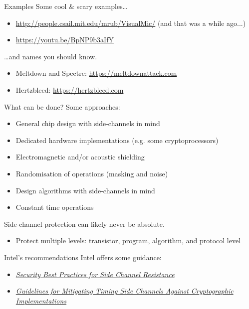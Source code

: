 \begin{frame}{Examples}
  Some cool \& scary examples\dots
  \begin{itemize}[<+(1)->]
    \item {\small\url{http://people.csail.mit.edu/mrub/VisualMic/}} (and that was a while ago...)
    \item {\small\url{https://youtu.be/BpNP9b3aIfY}}
  \end{itemize}

  \vspace*{1em}

  \pause
  \dots{}and names you should know.
  \begin{itemize}[<+(1)->]
    \item Meltdown and Spectre: {\small\url{https://meltdownattack.com}}
    \item Hertzbleed: {\small\url{https://hertzbleed.com}}
  \end{itemize}
\end{frame}

\begin{frame}{What can be done?}
  Some approaches:
  \begin{itemize}[<+(1)->]
    \item General chip design with side-channels in mind
    \item Dedicated hardware implementations (e.g. some cryptoprocessors)
    \item Electromagnetic and/or acoustic shielding
    \item Randomisation of operations (masking and noise)
    \item Design algorithms with side-channels in mind
    \item Constant time operations
  \end{itemize}

  \vspace*{1em}

  \pause
  Side-channel protection can likely never be absolute.
  \begin{itemize}[<+(1)->]
    \item Protect multiple levels: transistor, program, algorithm, and protocol level
  \end{itemize}
\end{frame}

\begin{frame}{Intel's recommendations}
  Intel offers some guidance:
  \begin{itemize}
    \item \href{https://www.intel.com/content/www/us/en/developer/articles/technical/software-security-guidance/secure-coding/security-best-practices-side-channel-resistance.html}{\textit{Security Best Practices for Side Channel Resistance}}
    \item \href{https://www.intel.com/content/www/us/en/developer/articles/technical/software-security-guidance/secure-coding/mitigate-timing-side-channel-crypto-implementation.html}{\textit{Guidelines for Mitigating Timing Side Channels Against Cryptographic Implementations}}
  \end{itemize}
\end{frame}

